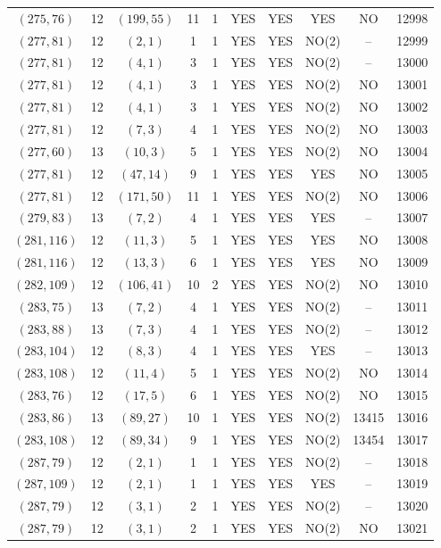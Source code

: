 \begin{longtable}{|c|c|c|c|c|c|c|c|c|c|}
$(275, 76)$ & 12 & $(199, 55)$ & 11 & 1 & YES & YES & YES & NO & 12998\\
$(277, 81)$ & 12 & $(2, 1)$ & 1 & 1 & YES & YES & NO(2) & -- & 12999\\
$(277, 81)$ & 12 & $(4, 1)$ & 3 & 1 & YES & YES & NO(2) & -- & 13000\\
$(277, 81)$ & 12 & $(4, 1)$ & 3 & 1 & YES & YES & NO(2) & NO & 13001\\
$(277, 81)$ & 12 & $(4, 1)$ & 3 & 1 & YES & YES & NO(2) & NO & 13002\\
$(277, 81)$ & 12 & $(7, 3)$ & 4 & 1 & YES & YES & NO(2) & NO & 13003\\
$(277, 60)$ & 13 & $(10, 3)$ & 5 & 1 & YES & YES & NO(2) & NO & 13004\\
$(277, 81)$ & 12 & $(47, 14)$ & 9 & 1 & YES & YES & YES & NO & 13005\\
$(277, 81)$ & 12 & $(171, 50)$ & 11 & 1 & YES & YES & NO(2) & NO & 13006\\
$(279, 83)$ & 13 & $(7, 2)$ & 4 & 1 & YES & YES & YES & -- & 13007\\
$(281, 116)$ & 12 & $(11, 3)$ & 5 & 1 & YES & YES & YES & NO & 13008\\
$(281, 116)$ & 12 & $(13, 3)$ & 6 & 1 & YES & YES & YES & NO & 13009\\
$(282, 109)$ & 12 & $(106, 41)$ & 10 & 2 & YES & YES & NO(2) & NO & 13010\\
$(283, 75)$ & 13 & $(7, 2)$ & 4 & 1 & YES & YES & NO(2) & -- & 13011\\
$(283, 88)$ & 13 & $(7, 3)$ & 4 & 1 & YES & YES & NO(2) & -- & 13012\\
$(283, 104)$ & 12 & $(8, 3)$ & 4 & 1 & YES & YES & YES & -- & 13013\\
$(283, 108)$ & 12 & $(11, 4)$ & 5 & 1 & YES & YES & NO(2) & NO & 13014\\
$(283, 76)$ & 12 & $(17, 5)$ & 6 & 1 & YES & YES & NO(2) & NO & 13015\\
$(283, 86)$ & 13 & $(89, 27)$ & 10 & 1 & YES & YES & NO(2) & 13415 & 13016\\
$(283, 108)$ & 12 & $(89, 34)$ & 9 & 1 & YES & YES & NO(2) & 13454 & 13017\\
$(287, 79)$ & 12 & $(2, 1)$ & 1 & 1 & YES & YES & NO(2) & -- & 13018\\
$(287, 109)$ & 12 & $(2, 1)$ & 1 & 1 & YES & YES & YES & -- & 13019\\
$(287, 79)$ & 12 & $(3, 1)$ & 2 & 1 & YES & YES & NO(2) & -- & 13020\\
$(287, 79)$ & 12 & $(3, 1)$ & 2 & 1 & YES & YES & NO(2) & NO & 13021\\

\end{longtable}
